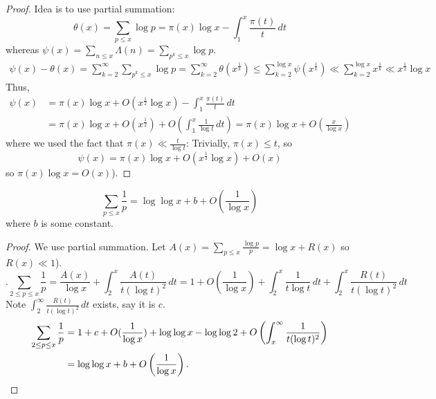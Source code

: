 \documentclass{article}
\begin{document}
\begin{proof}
  Idea is to use partial summation:
  \begin{equation*}
    \theta(x) = \sum_{p \leq x} \log p = \pi(x) \log x - \int_1^x \frac{\pi(t)}{t} \, dt
  \end{equation*}
  whereas $\psi(x) = \sum_{n \leq x} \Lambda(n) = \sum_{p^k \leq x} \log p$.
  \begin{align*}
    \psi(x) - \theta(x) = \sum_{k=2}^\infty \sum_{p^k \leq x} \log p = \sum_{k=2}^\infty \theta(x^{\frac{1}{k}}) \leq \sum_{k=2}^{\log x} \psi(x^{\frac{1}{k}}) \ll \sum_{k=2}^{\log x} x^{\frac{1}{k}} \ll x^{\frac{1}{2}} \log x
  \end{align*}
  Thus,
  \begin{align*}
    \psi(x) &= \pi(x) \log x + O(x^{\frac{1}{2}} \log x) - \int_1^x \frac{\pi(t)}{t} \, dt \\
            &= \pi(x) \log x + O(x^{\frac{1}{2}}) + O(\int_1^x \frac{1}{\log t} \, dt) = \pi(x) \log x + O(\frac{x}{\log x})
  \end{align*}
  where we used the fact that $\pi(x) \ll \frac{t}{\log t}$:
  Trivially, $\pi(x) \leq t$, so
  \begin{equation*}
    \psi(x) = \pi(x) \log x + O(x^{\frac{1}{2}} \log x) + O(x)
  \end{equation*}
  so $\pi(x) \log x = O(x)$).
\end{proof}
\begin{nlemma}\label{lem:9}
  \begin{equation*}
    \sum_{p \leq x} \frac{1}{p} = \log \log x + b + O(\frac{1}{\log x})
  \end{equation*}
  where $b$ is some constant.
\end{nlemma}
\begin{proof}
  We use partial summation. Let $A(x) = \sum_{p \leq x} \frac{\log p}{p} = \log x + R(x)$ so $R(x) \ll 1$).
  \begin{equation*}.
    \sum_{2 \leq p\leq x} \frac{1}{p} = \frac{A(x)}{\log x} + \int_2^x \frac{A(t)}{t (\log t)^2} \, dt = 1 + O(\frac{1}{\log x}) + \int_2^x \frac{1}{t \log t} \, dt + \int_2^x \frac{R(t)}{t (\log t)^2} \, dt
  \end{equation*}
  Note $\int_2^\infty \frac{R(t)}{t (\log t)^2} \, dt$ exists, say it is $c$.
  \begin{align*}
    \sum_{2 \leq p \leq x} \frac{1}{p} &= 1 + c + O(\frac{1}{\log x}) + \log \log x - \log \log 2 + O\left(\int_x^\infty \frac{1}{t (\log t)^2}\right) \\
                                       &= \log \log x + b + O\left(\frac{1}{\log x}\right). \qedhere
  \end{align*}
\end{proof}
\end{document}
